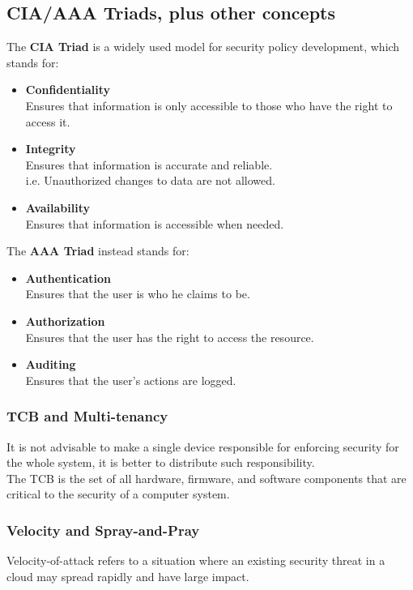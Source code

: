 \subsection{CIA/AAA Triads, plus other concepts}
The \textbf{CIA Triad} is a widely used model for security policy development, which stands for:
\begin{itemize}
   \item \textbf{Confidentiality}\\
   Ensures that information is only accessible to those who have the right to access it.
   \item \textbf{Integrity}\\
   Ensures that information is accurate and reliable.\\
   i.e. Unauthorized changes to data are not allowed.
   \item \textbf{Availability}\\
   Ensures that information is accessible when needed.
\end{itemize}

The \textbf{AAA Triad} instead stands for:
\begin{itemize}
   \item \textbf{Authentication}\\
   Ensures that the user is who he claims to be.
   \item \textbf{Authorization}\\
   Ensures that the user has the right to access the resource.
   \item \textbf{Auditing}\\
   Ensures that the user's actions are logged.
\end{itemize}

\subsubsection{TCB and Multi-tenancy}
It is not advisable to make a single device responsible for enforcing security for the whole system, it is better to distribute such responsibility.\\
The TCB is the set of all hardware, firmware, and software components that are critical to the security of a computer system.

\subsubsection{Velocity and Spray-and-Pray}
Velocity-of-attack refers to a situation where an existing security threat in a cloud may spread rapidly and have large impact.

